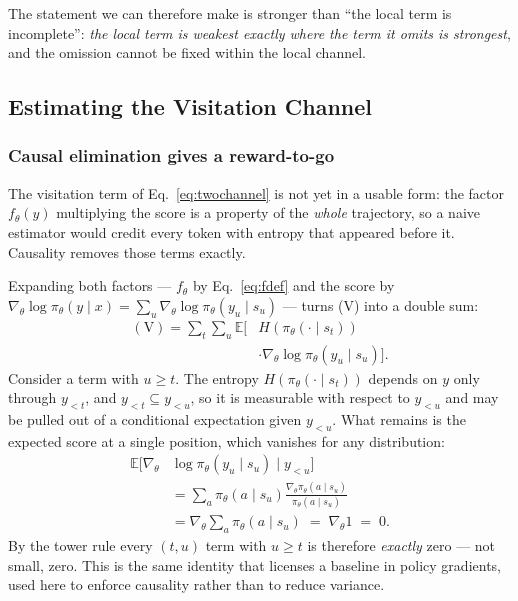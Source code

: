 \documentclass[11pt]{article}
\newcommand{\E}{\mathbb{E}}
\newcommand{\gradt}{\nabla_{\theta}}
\newcommand{\pit}{\pi_{\theta}}
\begin{document}
The statement we can therefore make is stronger than ``the local term is
incomplete'': \emph{the local term is weakest exactly where the term it omits is strongest}, and
the omission cannot be fixed within the local channel.

\subsection{Estimating the Visitation Channel}
\label{sec:ahdef-app}

\subsubsection{Causal elimination gives a reward-to-go}

The visitation term of Eq.~\eqref{eq:twochannel} is not yet in a usable form: the
factor $f_\theta(y)$ multiplying the score is a property of the \emph{whole}
trajectory, so a naive estimator would credit every token with entropy that appeared
before it. Causality removes those terms exactly.

Expanding both factors --- $f_\theta$ by Eq.~\eqref{eq:fdef} and the score by
$\gradt \log \pit(y \mid x) = \sum_u \gradt \log \pit(y_u \mid s_u)$ --- turns (V)
into a double sum:
%
\begin{equation}
\begin{split}
(\mathrm{V}) = \sum_t \sum_u
\E\bigl[&H(\pit(\cdot \mid s_t))\\
&\cdot \gradt \log \pit(y_u \mid s_u)\bigr].
\end{split}
\label{eq:doublesum}
\end{equation}
%
Consider a term with $u \ge t$. The entropy $H(\pit(\cdot \mid s_t))$ depends on $y$
only through $y_{<t}$, and $y_{<t} \subseteq y_{<u}$, so it is measurable with
respect to $y_{<u}$ and may be pulled out of a conditional expectation given
$y_{<u}$. What remains is the expected score at a single position, which vanishes
for any distribution:
%
\begin{equation}
\begin{split}
\E\bigl[\gradt &\log \pit(y_u \mid s_u) \mid y_{<u}\bigr]\\
&= \sum_a \pit(a \mid s_u) \frac{\gradt \pit(a \mid s_u)}{\pit(a \mid s_u)}\\
&= \gradt \!\sum_a \pit(a \mid s_u)
\;=\; \gradt 1 \;=\; 0 .
\end{split}
\label{eq:scorezero}
\end{equation}
%
By the tower rule every $(t, u)$ term with $u \ge t$ is therefore \emph{exactly}
zero --- not small, zero. This is the same identity that licenses a baseline in
policy gradients, used here to enforce causality rather than to reduce variance.
\end{document}
